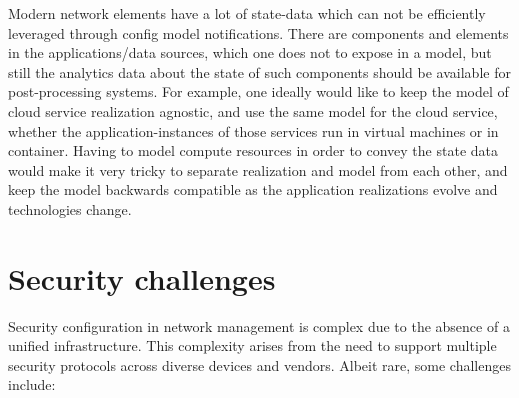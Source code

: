 \documentclass[10pt,sigconf]{iabart}
\begin{document}
Modern network elements have a lot of state-data which can not be efficiently leveraged through config model notifications. There are components and elements in the applications/data sources, which one does not to expose in a model, but still the analytics data about the state of such components should be available for post-processing systems. For example, one ideally would like to keep the model of cloud service realization agnostic, and use the same model for the cloud service, whether the application-instances of those services run in virtual machines or in container. Having to model compute resources in order to convey the state data would make it very tricky to separate realization and model from each other, and keep the model backwards compatible as the application realizations evolve and technologies change.






\section{Security challenges} \label{security}

Security configuration in network management is complex due to the absence of a unified infrastructure. This complexity arises from the need to support multiple security protocols across diverse devices and vendors. Albeit rare, some challenges include:
\end{document}
